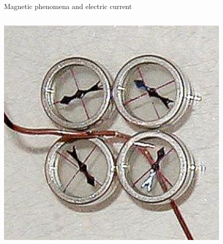 \begin{frame}{Magnetic phenomena and electric current}
\begin{columns}
\begin{column}{0.60\textwidth}
\begin{center}
      \includegraphics[width=0.85\textwidth]{./images/photos/compass_deflection_wire_current_up.jpg}\\
    \end{center}
  \end{column}
\end{columns}

\end{frame}

%
%
%

